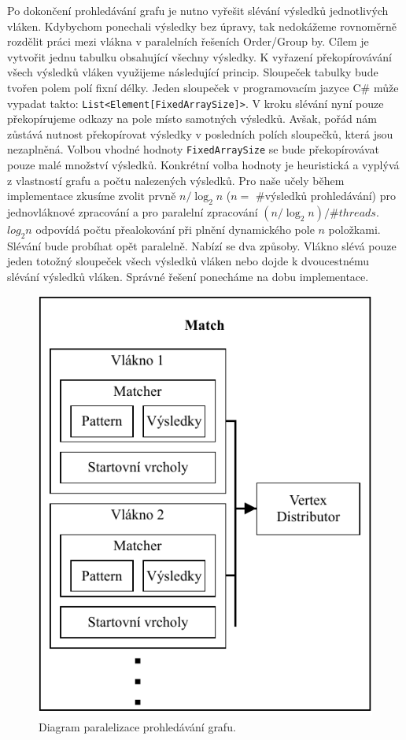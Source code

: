 Po dokončení prohledávání grafu je nutno vyřešit slévání výsledků jednotlivých vláken.
Kdybychom ponechali výsledky bez úpravy, tak nedokážeme rovnoměrně rozdělit práci mezi vlákna v paralelních řešeních Order/Group by.
Cílem je vytvořit jednu tabulku obsahující všechny výsledky.
K vyřazení překopírovávání všech výsledků vláken využijeme následující princip.
Sloupeček tabulky bude tvořen polem polí fixní délky.
Jeden sloupeček v programovacím jazyce C\# může vypadat takto: \texttt{List<Element[FixedArraySize]>}.
V kroku slévání nyní pouze překopírujeme odkazy na pole místo samotných výsledků.
Avšak, pořád nám zůstává nutnost překopírovat výsledky v posledních polích sloupečků, která jsou nezaplněná.
Volbou vhodné hodnoty \texttt{FixedArraySize} se bude překopírovávat pouze malé množství výsledků.
Konkrétní volba hodnoty je heuristická a vyplývá z vlastností grafu a počtu nalezených výsledků.
Pro naše učely během implementace zkusíme zvolit prvně $n/\log_2 n$ ($n = $ \#výsledků prohledávání) pro jednovláknové zpracování a pro paralelní zpracování $(n/\log_2 n)/\#threads$.
$log_2 n$ odpovídá počtu přealokování při plnění dynamického pole $n$ položkami.
Slévání bude probíhat opět paralelně.
Nabízí se dva způsoby.
Vlákno slévá pouze jeden totožný sloupeček všech výsledků vláken nebo dojde k dvoucestnému slévání výsledků vláken.
Správné řešení ponecháme na dobu implementace.    

\clearpage

\begin{figure}[!htp]
\includegraphics{../img/diaQueryObjectsMatchPar.pdf}\centering
\caption{Diagram paralelizace prohledávání grafu.}
\label{figure.diaQueryObjectsMatchPar}
\end{figure}

